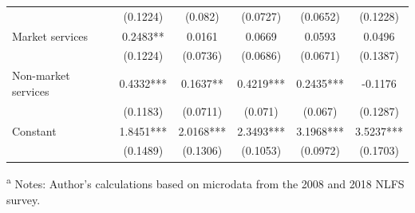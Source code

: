\begin{table}[htbp]
{\begin{tabular}{lccccc}
& (0.1224) & (0.082) & (0.0727) & (0.0652) & (0.1228) \\
\hspace{1em}Market services & 0.2483** & 0.0161 & 0.0669 & 0.0593 & 0.0496 \\
& (0.1224) & (0.0736) & (0.0686) & (0.0671) & (0.1387) \\
\hspace{1em}Non-market services & 0.4332*** & 0.1637** & 0.4219*** & 0.2435*** & -0.1176 \\
& (0.1183) & (0.0711) & (0.071) & (0.067) & (0.1287) \\
Constant & 1.8451*** & 2.0168*** & 2.3493*** & 3.1968*** & 3.5237*** \\
& (0.1489) & (0.1306) & (0.1053) & (0.0972) & (0.1703) \\
\bottomrule
\end{tabular}}
\footnotesize{
\raggedleft
\textsuperscript{a} Notes: Author's calculations based on microdata from the 2008 and 2018 NLFS survey. }
\end{table}


